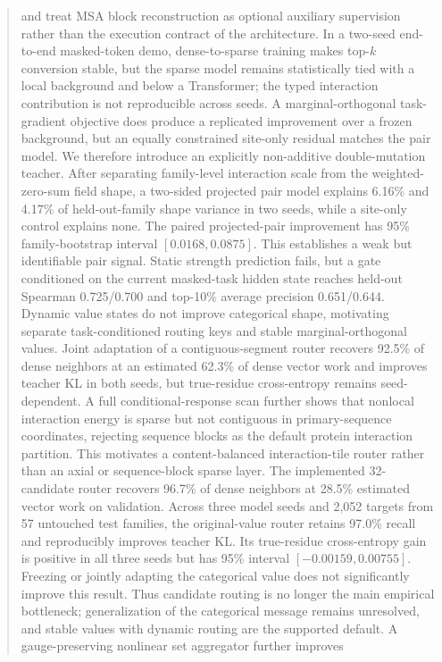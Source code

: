\documentclass[10pt]{article}
\begin{document}
\begin{abstract}
and treat MSA block reconstruction as optional auxiliary supervision rather than the execution
contract of the architecture.  In a two-seed end-to-end masked-token demo, dense-to-sparse
training makes top-$k$ conversion stable, but the sparse model remains statistically tied with a
local background and below a Transformer; the typed interaction contribution is not
reproducible across seeds.  A marginal-orthogonal task-gradient objective does produce a
replicated improvement over a frozen background, but an equally constrained site-only residual
matches the pair model.  We therefore introduce an explicitly non-additive double-mutation
teacher.  After separating family-level interaction scale from the weighted-zero-sum field
shape, a two-sided projected pair model explains 6.16\% and 4.17\% of held-out-family shape
variance in two seeds, while a site-only control explains none.  The paired projected-pair
improvement has 95\% family-bootstrap interval $[0.0168,0.0875]$.  This establishes a weak but
identifiable pair signal.  Static strength prediction fails, but a gate conditioned on the current
masked-task hidden state reaches held-out Spearman 0.725/0.700 and top-10\% average precision
0.651/0.644.  Dynamic value states do not improve categorical shape, motivating separate
task-conditioned routing keys and stable marginal-orthogonal values.
Joint adaptation of a contiguous-segment router recovers 92.5\% of dense neighbors at an
estimated 62.3\% of dense vector work and improves teacher KL in both seeds, but true-residue
cross-entropy remains seed-dependent.  A full conditional-response scan further shows that
nonlocal interaction energy is sparse but not contiguous in primary-sequence coordinates,
rejecting sequence blocks as the default protein interaction partition.  This motivates a
content-balanced interaction-tile router rather than an axial or sequence-block sparse layer.
The implemented 32-candidate router recovers 96.7\% of dense neighbors at 28.5\% estimated
vector work on validation.  Across three model seeds and 2,052 targets from 57 untouched test
families, the original-value router retains 97.0\% recall and reproducibly improves teacher KL.
Its true-residue cross-entropy gain is positive in all three seeds but has 95\% interval
$[-0.00159,0.00755]$.  Freezing or jointly adapting the categorical value does not significantly
improve this result.  Thus candidate routing is no longer the main empirical bottleneck;
generalization of the categorical message remains unresolved, and stable values with dynamic
routing are the supported default.  A gauge-preserving nonlinear set aggregator further improves

\end{abstract}
\end{document}
